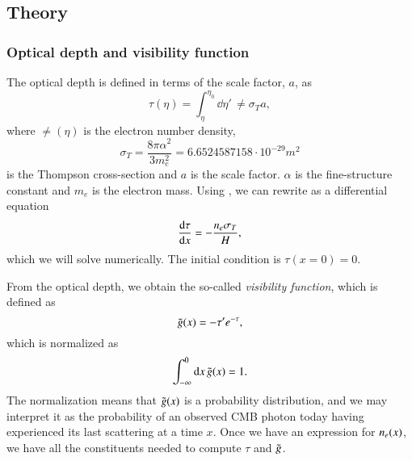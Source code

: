 

\subsection{Theory}\label{ssec:M2:theory}

\subsubsection{Optical depth and visibility function} \label{sssec:M2:optical_depth_and_visibility_function}

The optical depth is defined in terms of the scale factor, $a$, as 
\begin{equation} \label{eq:M2:theory:optical_depth_integral_definition}
    \tau(\eta) = \int_\eta^{\eta_0} \dd \eta' \,\ne \sigma_T a,
\end{equation}
where $\ne(\eta)$ is the electron number density,
\begin{equation} \label{eq:M2:theory:thomspon_cross_section}
    \sigma_T=\frac{8\pi\alpha^2}{3 m_e^2} = 6.6524587158\cdot 10^{-29}\unit{m^2} 
\end{equation}
is the Thompson cross-section and $a$ is the scale factor. $\alpha$ is the fine-structure constant and $m_e$ is the electron mass. Using , we can rewrite  as a differential equation 
\begin{equation} \label{eq:M2:theory:tau_ODE}
    \dv{\tau}{x} = - \frac{n_e \sigma_T}{H},
\end{equation}
which we will solve numerically. The initial condition is $\tau(x=0)=0$.

From the optical depth, we obtain the so-called \textit{visibility function}, which is defined as 
\begin{equation} \label{eq:M2:theory:g_tilde_of_x_definition}
    \tilde{g}(x) = -\tau' e^{-\tau},
\end{equation}
which is normalized as 
\begin{equation} \label{eq:M2:theory:g_tilde_normalization}
    \int_{-\infty}^0\dd x\,\tilde{g}(x) = 1.
\end{equation}
The normalization means that $\tilde{g}(x)$ is a probability distribution, and we may interpret it as the probability of an observed CMB photon today having experienced its last scattering at a time $x$.  Once we have an expression for $n_e(x)$, we have all the constituents needed to compute $\tau$ and $\tilde{g}$.


